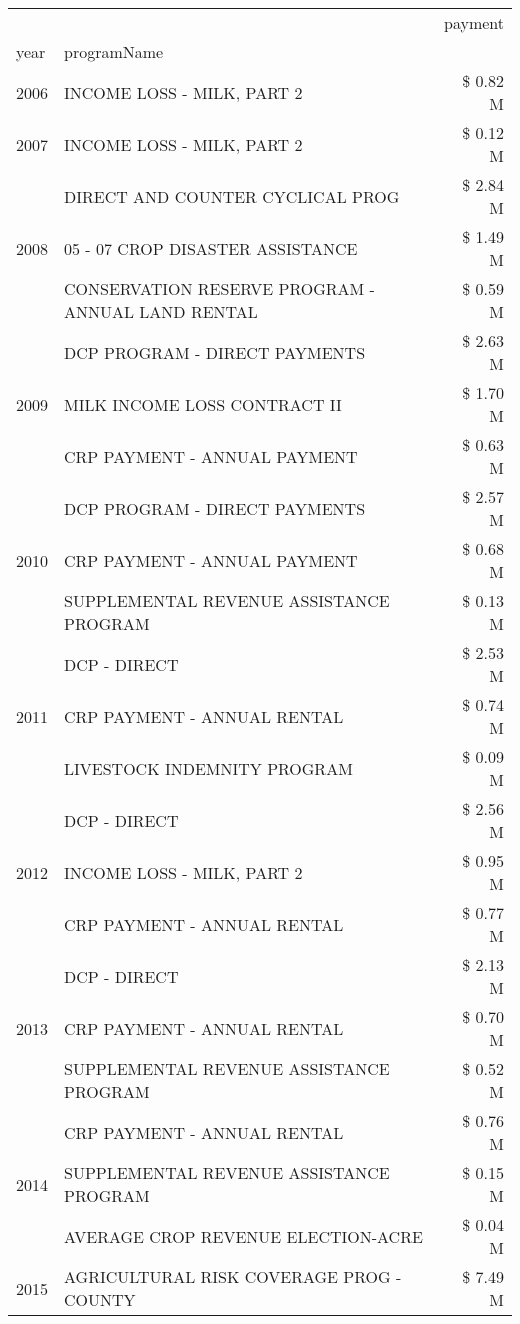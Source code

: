\begin{tabular}{llr}
\toprule
 &  & payment \\
year & programName &  \\
\midrule
2006 & INCOME LOSS - MILK, PART 2 & \$ 0.82 M \\
\cline{1-3}
2007 & INCOME LOSS - MILK, PART 2 & \$ 0.12 M \\
\cline{1-3}
\multirow[t]{3}{*}{2008} & DIRECT AND COUNTER CYCLICAL PROG & \$ 2.84 M \\
 & 05 - 07 CROP DISASTER ASSISTANCE & \$ 1.49 M \\
 & CONSERVATION RESERVE PROGRAM - ANNUAL LAND RENTAL & \$ 0.59 M \\
\cline{1-3}
\multirow[t]{3}{*}{2009} & DCP PROGRAM - DIRECT PAYMENTS & \$ 2.63 M \\
 & MILK INCOME LOSS CONTRACT II & \$ 1.70 M \\
 & CRP PAYMENT - ANNUAL PAYMENT & \$ 0.63 M \\
\cline{1-3}
\multirow[t]{3}{*}{2010} & DCP PROGRAM - DIRECT PAYMENTS & \$ 2.57 M \\
 & CRP PAYMENT - ANNUAL PAYMENT & \$ 0.68 M \\
 & SUPPLEMENTAL REVENUE ASSISTANCE PROGRAM & \$ 0.13 M \\
\cline{1-3}
\multirow[t]{3}{*}{2011} & DCP - DIRECT & \$ 2.53 M \\
 & CRP PAYMENT - ANNUAL RENTAL & \$ 0.74 M \\
 & LIVESTOCK INDEMNITY PROGRAM & \$ 0.09 M \\
\cline{1-3}
\multirow[t]{3}{*}{2012} & DCP - DIRECT & \$ 2.56 M \\
 & INCOME LOSS - MILK, PART 2 & \$ 0.95 M \\
 & CRP PAYMENT - ANNUAL RENTAL & \$ 0.77 M \\
\cline{1-3}
\multirow[t]{3}{*}{2013} & DCP - DIRECT & \$ 2.13 M \\
 & CRP PAYMENT - ANNUAL RENTAL & \$ 0.70 M \\
 & SUPPLEMENTAL REVENUE ASSISTANCE PROGRAM & \$ 0.52 M \\
\cline{1-3}
\multirow[t]{3}{*}{2014} & CRP PAYMENT - ANNUAL RENTAL & \$ 0.76 M \\
 & SUPPLEMENTAL REVENUE ASSISTANCE PROGRAM & \$ 0.15 M \\
 & AVERAGE CROP REVENUE ELECTION-ACRE & \$ 0.04 M \\
\cline{1-3}
\multirow[t]{3}{*}{2015} & AGRICULTURAL RISK COVERAGE PROG - COUNTY & \$ 7.49 M \\

\end{tabular}
